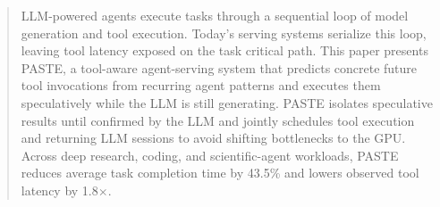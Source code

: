 \begin{abstract}



LLM-powered agents execute tasks through a sequential loop of model generation and tool execution. Today's serving systems serialize this loop, leaving tool latency exposed on the task critical path. 
This paper presents PASTE, a tool-aware agent-serving system that predicts concrete future tool invocations from recurring agent patterns and executes them speculatively while the LLM is still generating. PASTE isolates speculative results until confirmed by the LLM and jointly schedules tool execution and returning LLM sessions to avoid shifting bottlenecks to the GPU. Across deep research, coding, and scientific-agent workloads, PASTE reduces average task completion time by 43.5\% and lowers observed tool latency by 1.8$\times$. 
\end{abstract}
